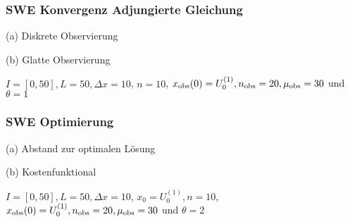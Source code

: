 % 
% 

\begin{frame}[<+->]
\frametitle{SWE Konvergenz Adjungierte Gleichung}
\begin{minipage}[b]{0.49\linewidth}
\centering

(a) Diskrete Observierung
\end{minipage}
\begin{minipage}[b]{0.49\linewidth}
\centering

(b) Glatte Observierung
\end{minipage}
\centering
$I=[0,50],L=50,\Delta x=10$, $n=10$, $x_\text{obs}(0) = U_0^{(1)}, n_{\text{obs}}=20,\mu_{\text{obs}}=30$ und $\theta=1$
\end{frame}

\begin{frame}[<+->]
\frametitle{SWE Optimierung}
\centering
\begin{minipage}[b]{0.49\linewidth}
 \centering

(a) Abstand zur optimalen Lösung
\end{minipage}
\begin{minipage}[b]{0.49\linewidth}
 \centering

(b) Kostenfunktional
\end{minipage}
$I=[0,50],L=50,\Delta x=10$, $x_0=U_0^{(1)},n=10$, $x_\text{obs}(0) = U_0^{(1)}, n_{\text{obs}}=20,\mu_{\text{obs}}=30$ und $\theta=2$

\end{frame}


